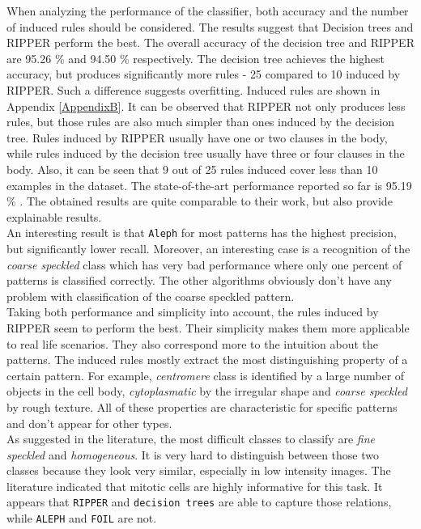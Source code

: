When analyzing the performance of the classifier, both accuracy and the number of induced rules should be considered. The results suggest that Decision trees and RIPPER perform the best. The overall accuracy of the decision tree and RIPPER are 95.26 \% and 94.50 \% respectively. The decision tree achieves the highest accuracy, but produces significantly  more rules - 25 compared to 10 induced by RIPPER. Such a difference suggests  overfitting. Induced rules are shown in Appendix \ref{AppendixB}. It can be observed that RIPPER not only produces less rules, but those rules are also much simpler than ones induced by the decision tree. Rules induced by RIPPER usually have one or two clauses in the body, while rules induced by the decision tree usually have three or four clauses in the body. Also, it can be seen that 9 out of 25 rules induced cover less than 10 examples in the dataset. The state-of-the-art performance reported so far is 95.19 \% \cite{Wiliem}. The obtained results are quite comparable to their work, but also provide explainable results.\\

An interesting result is that \texttt{Aleph} for most patterns has the highest precision, but significantly lower recall. Moreover, an interesting case is a recognition of the \textit{coarse speckled} class which has very bad performance where only one percent of patterns is classified correctly. The other algorithms obviously don't have any problem with classification of the coarse speckled pattern. \\

Taking both performance and simplicity into account, the rules induced by RIPPER seem to perform the best. Their simplicity makes them more applicable to real life scenarios. They also correspond more to the intuition about the patterns. The induced rules mostly extract the most distinguishing property of a certain pattern. For example, \textit{centromere} class is identified by a large number of objects in the cell body, \textit{cytoplasmatic} by the irregular shape and \textit{coarse speckled} by rough texture. All of these properties are characteristic for specific patterns and don't appear for other types. \\

As suggested in the literature, the most difficult classes to classify are \textit{fine speckled} and \textit{homogeneous}. It is very hard to distinguish between those two classes because they look very similar, especially in low intensity images. The literature indicated that mitotic cells are highly informative for this task. It appears that  \texttt{RIPPER} and \texttt{decision trees} are able to capture those relations, while \texttt{ALEPH} and \texttt{FOIL} are not. \\

